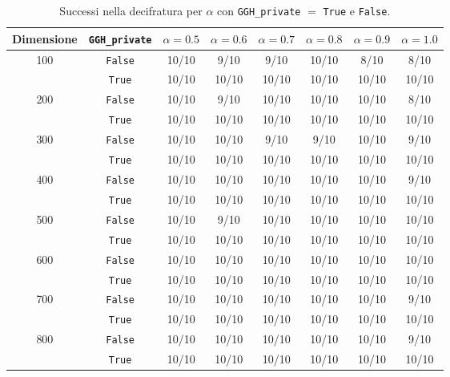 \begin{table}[H]
    \centering
    \begin{tabular}{|c|c|c|c|c|c|c|c|}
    \hline
    Dimensione & \texttt{GGH\_private} & $\alpha=0.5$ & $\alpha=0.6$ & $\alpha=0.7$ & $\alpha=0.8$ & $\alpha=0.9$ & $\alpha=1.0$ \\
    \hline
    \multirow{2}{*}{100} & \texttt{False} & 10/10 & 9/10 & 9/10 & 10/10 & 8/10 & 8/10 \\
                         & \texttt{True}  & 10/10 & 10/10 & 10/10 & 10/10 & 10/10 & 10/10 \\
    \hline
    \multirow{2}{*}{200} & \texttt{False} & 10/10 & 9/10 & 10/10 & 10/10 & 10/10 & 8/10 \\
                         & \texttt{True}  & 10/10 & 10/10 & 10/10 & 10/10 & 10/10 & 10/10 \\
    \hline
    \multirow{2}{*}{300} & \texttt{False} & 10/10 & 10/10 & 9/10 & 9/10 & 10/10 & 9/10 \\
                         & \texttt{True}  & 10/10 & 10/10 & 10/10 & 10/10 & 10/10 & 10/10 \\
    \hline
    \multirow{2}{*}{400} & \texttt{False} & 10/10 & 10/10 & 10/10 & 10/10 & 10/10 & 9/10 \\
                         & \texttt{True}  & 10/10 & 10/10 & 10/10 & 10/10 & 10/10 & 10/10 \\
    \hline
    \multirow{2}{*}{500} & \texttt{False} & 10/10 & 9/10 & 10/10 & 10/10 & 10/10 & 10/10 \\
                         & \texttt{True}  & 10/10 & 10/10 & 10/10 & 10/10 & 10/10 & 10/10 \\
    \hline
    \multirow{2}{*}{600} & \texttt{False} & 10/10 & 10/10 & 10/10 & 10/10 & 10/10 & 10/10 \\
                         & \texttt{True}  & 10/10 & 10/10 & 10/10 & 10/10 & 10/10 & 10/10 \\
    \hline
    \multirow{2}{*}{700} & \texttt{False} & 10/10 & 10/10 & 10/10 & 10/10 & 10/10 & 9/10 \\
                         & \texttt{True}  & 10/10 & 10/10 & 10/10 & 10/10 & 10/10 & 10/10 \\
    \hline
    \multirow{2}{*}{800} & \texttt{False} & 10/10 & 10/10 & 10/10 & 10/10 & 10/10 & 9/10 \\
                         & \texttt{True}  & 10/10 & 10/10 & 10/10 & 10/10 & 10/10 & 10/10 \\
    \hline
    \end{tabular}
    \caption{Successi nella decifratura per $\alpha$ con 
    \texttt{GGH\_private} $=$ \texttt{True} e \texttt{False}.}
    \label{tab:combined_successes_hnf}
\end{table}

